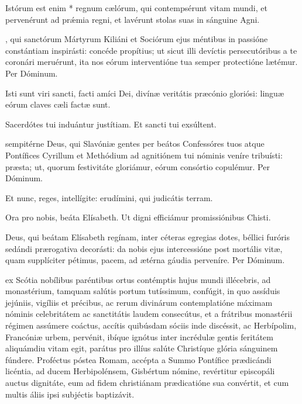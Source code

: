 \documentclass[fontsize=9pt,paper=A6,twoside,BCOR=1mm,DIV=22,headinclude]{scrarticle}
\renewcommand\A{\Ant}
\begin{document}
\begin{multicols}{2}
{ Istórum est enim * regnum cælórum, qui contempsérunt vitam mundi, et pervenérunt ad pr\'æmia regni, et lavérunt stolas suas in sánguine Agni.

, qui sanctórum Mártyrum Kiliáni et Sociórum ejus méntibus in passióne constántiam inspirásti: concéde propítius; ut sicut illi devíctis persecutóribus a te coronári meruérunt, ita nos eórum interventióne tua semper protectióne lætémur. Per Dóminum.


\A Isti sunt viri sancti, facti amíci Dei, divínæ veritátis præcónio gloriósi: linguæ eórum claves cæli factæ sunt.

\V Sacerdótes tui induántur justítiam. 
\R Et sancti tui exsúltent.

 sempitérne Deus, qui Slavóniæ gentes per beátos Confessóres tuos atque Pontífices Cyrillum et Methódium ad agnitiónem tui nóminis veníre tribuísti: præsta; ut, quorum festivitáte gloriámur, eórum consórtio copulémur. \red{(}Per Dóminum.\red{)}


\A Et nunc, reges, intellígite: erudímini, qui judicátis terram.

\V Ora pro nobis, beáta Elísabeth.
\R Ut digni efficiámur promissiónibus Chisti.


 Deus, qui beátam Elísabeth regínam, inter céteras egregias dotes, béllici furóris sedándi prærogativa decorásti: da nobis ejus intercessióne post mortális vitæ, quam supplíciter pétimus, pacem, ad ætérna gáudia perveníre. Per Dóminum.


 ex Scótia nobílibus paréntibus ortus contémptis hujus mundi illécebris, ad monastérium, tamquam salútis portum tutíssimum, confúgit, in quo assíduis jejúniis, vigíliis et précibus, ac rerum divinárum contemplatióne máximam nóminis celebritátem ac sanctitátis laudem consecútus, et a frátribus monastérii régimen assúmere coáctus, accítis quibúsdam sóciis inde discéssit, ac Herbípolim, Francóniæ urbem, pervénit, ibíque ignótus inter incrédulæ gentis feritátem aliquámdiu vitam egit, parátus pro illíus salúte Christíque glória sánguinem fúndere. Proféctus póstea Romam, accépta a Summo Pontífice prædicándi licéntia, ad ducem Herbipolénsem, Gisbértum nómine, revértitur episcopáli auctus dignitáte, eum ad fidem christiánam prædicatióne sua convértit, et cum multis áliis ipsi subjéctis baptizávit.

}
\end{multicols}
\end{document}
